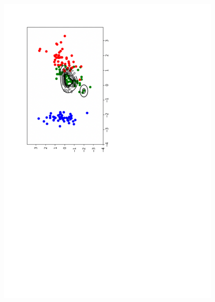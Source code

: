 \documentclass [11pt,a4paper,twoside,openright] {book}
\begin{document}
\begin{figure}[!t]
          {\includegraphics[scale=.35]{figure/wirnversicolor.pdf}}\qquad\qquad
           \subfigure[virginica]%

\end{figure}
\end{document}
